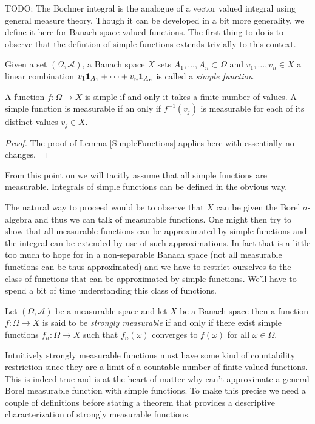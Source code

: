 TODO:
The Bochner integral is the analogue of a vector valued integral using
general measure theory.  Though it can be developed in a bit more
generality, we define it here for Banach space valued functions.  
The first thing to do is to observe that the defintion of simple functions
extends trivially to this context.
\begin{defn}Given a set $(\Omega, \mathcal{A})$, a Banach space $X$
  sets $A_1, \dotsc, A_n \subset \Omega$ and $v_1, \dotsc, v_n \in X$ a
  linear combination $v_1
  \textbf{1}_{A_1} + \cdots + v_n \textbf{1}_{A_n}$ is called
  a \emph{simple function}.
\end{defn}

\begin{lem}\label{SimpleVectorValuedFunctions}A function $f : \Omega \to X$ is simple if and only it
  takes a finite number of values.  A simple function is measurable if
  an only if $f^{-1}(v_j)$ is measurable for each of its distinct
  values $v_j \in X$.
\end{lem}
\begin{proof}
The proof of Lemma \ref{SimpleFunctions} applies here with essentially
no changes.
\end{proof}

From this point on we will tacitly assume that all simple functions
are measurable. Integrals of simple functions can be defined in the obvious way.

The natural way to proceed would be to observe that $X$ can be given
the Borel $\sigma$-algebra and thus we can talk of measurable
functions.  One might then try to show that all measurable functions
can be approximated by simple functions and the integral can be
extended by use of such approximations.  In fact that is a little too much to hope for in a
non-separable Banach space (not all measurable functions can be thus
approximated) 
and we have to restrict ourselves to the class of functions that can be approximated
by simple functions.  We'll have to spend a bit of time understanding
this class of functions. 

\begin{defn}Let $(\Omega,\mathcal{A})$ be a measurable space and let
  $X$ be a Banach space then a function $f : \Omega \to X$ is said to
  be \emph{strongly measurable} if and only if there exist simple
  functions $f_n : \Omega \to X$ such that $f_n(\omega)$ converges to 
$f(\omega)$ for  all $\omega \in \Omega$.
\end{defn}

Intuitively strongly measurable functions must have some kind of
countability restriction since they are a limit of a countable number
of finite valued functions.  This is indeed true and is at the heart
of matter why can't approximate a general Borel measurable function
with simple functions.  To make this precise we need a couple of
definitions before stating a theorem that provides a descriptive
characterization of strongly measurable functions.

